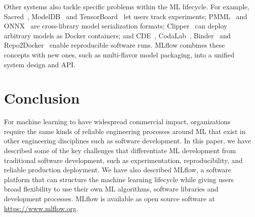 \documentclass[11pt]{article}
\begin{document}
Other systems also tackle specific problems within the ML lifecycle. For example, Sacred~\cite{sacred}, ModelDB~\cite{modeldb} and TensorBoard~\cite{tensorboard} let users track experiments; PMML~\cite{pmml} and ONNX~\cite{onnx} are cross-library model serialization formats; Clipper~\cite{clipper} can deploy arbitrary models as Docker containers; and CDE~\cite{cde}, CodaLab~\cite{codalab}, Binder~\cite{binder} and Repo2Docker~\cite{repo2docker} enable reproducible software runs. MLflow combines these concepts with new ones, such as multi-flavor model packaging, into a unified system design and API.

\section{Conclusion}

For machine learning to have widespread commercial impact, organizations require the same kinds of reliable engineering processes around ML that exist in other engineering disciplines such as software development. In this paper, we have described some of the key challenges that differentiate ML development from traditional software development, such as experimentation, reproducibility, and reliable production deployment. We have also described MLflow, a software platform that can structure the machine learning lifecycle while giving users broad flexibility to use their own ML algorithms, software libraries and development processes.
MLflow is available as open source software at \url{https://www.mlflow.org}.
\end{document}
